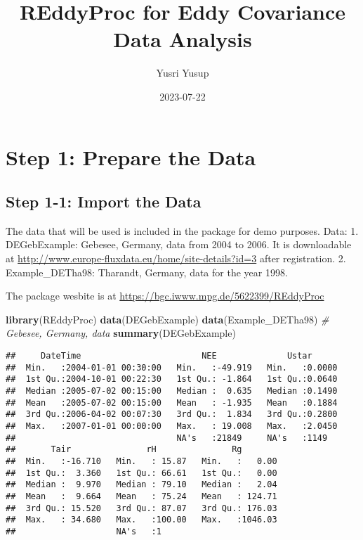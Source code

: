 \documentclass[
]{article}
\title{REddyProc for Eddy Covariance Data Analysis}
\author{Yusri Yusup}
\date{2023-07-22}
\newenvironment{Shaded}{\begin{snugshade}}{\end{snugshade}}
\newcommand{\CommentTok}[1]{\textcolor[rgb]{0.56,0.35,0.01}{\textit{#1}}}
\newcommand{\FunctionTok}[1]{\textcolor[rgb]{0.13,0.29,0.53}{\textbf{#1}}}
\newcommand{\NormalTok}[1]{#1}
\begin{document}
\maketitle

\hypertarget{step-1-prepare-the-data}{%
\section{Step 1: Prepare the Data}\label{step-1-prepare-the-data}}

\hypertarget{step-1-1-import-the-data}{%
\subsection{Step 1-1: Import the Data}\label{step-1-1-import-the-data}}

The data that will be used is included in the package for demo purposes.
Data: 1. DEGebExample: Gebesee, Germany, data from 2004 to 2006. It is
downloadable at
\url{http://www.europe-fluxdata.eu/home/site-details?id=3} after
registration. 2. Example\_DETha98: Tharandt, Germany, data for the year
1998.

The package wesbite is at
\url{https://bgc.iwww.mpg.de/5622399/REddyProc}

\begin{Shaded}
\begin{Highlighting}[]
\FunctionTok{library}\NormalTok{(REddyProc)}
\FunctionTok{data}\NormalTok{(DEGebExample)}
\FunctionTok{data}\NormalTok{(Example\_DETha98)}
\CommentTok{\# Gebesee, Germany, data }
\FunctionTok{summary}\NormalTok{(DEGebExample)}
\end{Highlighting}
\end{Shaded}

\begin{verbatim}
##     DateTime                        NEE              Ustar       
##  Min.   :2004-01-01 00:30:00   Min.   :-49.919   Min.   :0.0000  
##  1st Qu.:2004-10-01 00:22:30   1st Qu.: -1.864   1st Qu.:0.0640  
##  Median :2005-07-02 00:15:00   Median :  0.635   Median :0.1490  
##  Mean   :2005-07-02 00:15:00   Mean   : -1.935   Mean   :0.1884  
##  3rd Qu.:2006-04-02 00:07:30   3rd Qu.:  1.834   3rd Qu.:0.2800  
##  Max.   :2007-01-01 00:00:00   Max.   : 19.008   Max.   :2.0450  
##                                NA's   :21849     NA's   :1149    
##       Tair               rH               Rg         
##  Min.   :-16.710   Min.   : 15.87   Min.   :   0.00  
##  1st Qu.:  3.360   1st Qu.: 66.61   1st Qu.:   0.00  
##  Median :  9.970   Median : 79.10   Median :   2.04  
##  Mean   :  9.664   Mean   : 75.24   Mean   : 124.71  
##  3rd Qu.: 15.520   3rd Qu.: 87.07   3rd Qu.: 176.03  
##  Max.   : 34.680   Max.   :100.00   Max.   :1046.03  
##                    NA's   :1
\end{verbatim}
\end{document}
